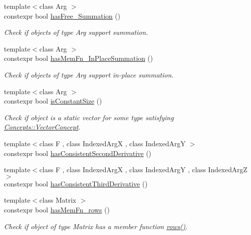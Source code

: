 \begin{DoxyCompactItemize}
{\footnotesize template$<$class Arg $>$ }\\constexpr bool \hyperlink{group__Checks_ga8545906a81acf9f533c3342b0d02a6e9}{has\+Free\+\_\+\+Summation} ()
\begin{DoxyCompactList}\small\item\em Check if objects of type Arg support summation. \end{DoxyCompactList}\item 
{\footnotesize template$<$class Arg $>$ }\\constexpr bool \hyperlink{group__Checks_ga5357edca3d0fdcfbc1fba5fd43713b40}{has\+Mem\+Fn\+\_\+\+In\+Place\+Summation} ()
\begin{DoxyCompactList}\small\item\em Check if objects of type Arg support in-\/place summation. \end{DoxyCompactList}\item 
{\footnotesize template$<$class Arg $>$ }\\constexpr bool \hyperlink{group__Checks_gadcc3e179af2ed0384a3773ea086045b9}{is\+Constant\+Size} ()
\begin{DoxyCompactList}\small\item\em Check if object is a static vector for some type satisfying \hyperlink{structFunG_1_1Concepts_1_1VectorConcept}{Concepts\+::\+Vector\+Concept}. \end{DoxyCompactList}\item 
{\footnotesize template$<$class F , class Indexed\+Arg\+X , class Indexed\+Arg\+Y $>$ }\\constexpr bool \hyperlink{group__Checks_ga072e2c21fa90be998a34975fb2975772}{has\+Consistent\+Second\+Derivative} ()
\item 
{\footnotesize template$<$class F , class Indexed\+Arg\+X , class Indexed\+Arg\+Y , class Indexed\+Arg\+Z $>$ }\\constexpr bool \hyperlink{group__Checks_gaad092e45db1d0c1d7b6f69a5562679fa}{has\+Consistent\+Third\+Derivative} ()
\item 
{\footnotesize template$<$class Matrix $>$ }\\constexpr bool \hyperlink{group__Checks_ga68fd30eff9d106c399b2b0e9a1f1b822}{has\+Mem\+Fn\+\_\+rows} ()
\begin{DoxyCompactList}\small\item\em Check if object of type Matrix has a member function \hyperlink{namespaceFunG_1_1LinearAlgebra_abd3afa2fcd2194787342b2662cfa9f5a}{rows()}. \end{DoxyCompactList}\item 

\end{DoxyCompactItemize}
